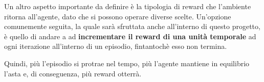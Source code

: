 Un altro aspetto importante da definire è la tipologia di reward che l'ambiente ritorna all'agente, dato che si possono operare diverse scelte. Un'opzione comunemente seguita, la quale sarà sfruttata anche all'interno di questo progetto, è quello di andare a ad \textbf{incrementare il reward di una unità temporale} ad ogni iterazione all'interno di un episodio, fintantochè esso non termina. 

Quindi, più l'episodio si protrae nel tempo, più l'agente mantiene in equilibrio l'asta e, di conseguenza, più reward otterrà.
